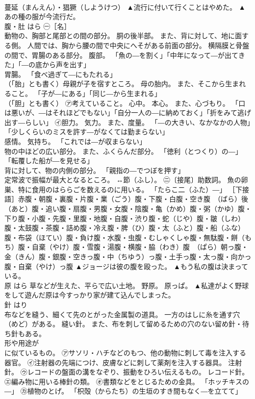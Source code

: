\documentclass[8pt]{extreport}
\begin{document}
\begin{CJK}{UTF8}{min}
\\	蔓延（まんえん）・猖獗（しようけつ）	▲流行に付いて行くことはやめた。 ▲あの種の服が今流行だ。
\\	腹・肚	はら	㊀［名］ 
\\	動物の、胸部と尾部との間の部分。 胴の後半部。 また、背に対して、地に面する側。 人間では、胸から腰の間で中央にへそがある前面の部分。 横隔膜と骨盤の間で、胃腸のある部分。 腹部。 「魚の―を割く」「中年になって―が出てきた」「―の底から声を出す」 
\\	胃腸。 「食べ過ぎて―にもたれる」 
\\	（「胎」とも書く）母親が子を宿すところ。 母の胎内。 また、そこから生まれること。 「子が―にある」「同じ―から生まれる」 
\\	（「胆」とも書く） ㋐考えていること。 心中。 本心。 また、心づもり。 「口は悪いが、―はそれほどでもない」「自分一人の―に納めておく」「折をみて逃げ出す―らしい」 ㋑胆力。 気力。 また、度量。 「―の大きい、なかなかの人物」「少しくらいのミスを許す―がなくては勤まらない」 
\\	感情。 気持ち。 「これでは―が収まらない」 
\\	物の中ほどの広い部分。 また、ふくらんだ部分。 「徳利（とつくり）の―」「転覆した船が―を見せる」 
\\	背に対して、物の内側の部分。 「親指の―でつぼを押す」 
\\	定常波で振幅が最大となるところ。 ↔節（ふし）。 ㊁〔接尾〕助数詞。 魚の卵巣、特に食用のはららごを数えるのに用いる。 「たらこ二（ふた）―」 ［下接語］赤腹・朝腹・裏腹・片腹・業（ごう）腹・下腹・白腹・空き腹　（ばら）後（あと）腹・追い腹・扇腹・男腹・女腹・陰腹・亀（かめ）腹・粥（かゆ）腹・下り腹・小腹・先腹・里腹・地腹・自腹・渋り腹・蛇（じや）腹・皺（しわ）腹・太鼓腹・茶腹・詰め腹・冷え腹・脾（ひ）腹・太（ふと）腹・船（ふな）腹・布袋（ほてい）腹・負け腹・水腹・虫腹・むしゃくしゃ腹・無駄腹・餅（もち）腹・自棄（やけ）腹・雪腹・湯腹・横腹・脇（わき）腹　（ぱら）朝っ腹・金（きん）腹・銀腹・空きっ腹・中（ちゆう）っ腹・土手っ腹・太っ腹・向かっ腹・自棄（やけ）っ腹	▲ジョージは彼の腹を殴った。 ▲もう私の腹は決まっている。
\\	原	はら	草などが生えた、平らで広い土地。 野原。 原っぱ。	▲私達がよく野球をして遊んだ原は今すっかり家が建て込んでしまった。
\\	針	はり	
\\	布などを縫う、細くて先のとがった金属製の道具。 一方のはしに糸を通す穴（めど）がある。 縫い針。 また、布を刺して留めるための穴のない留め針・待ち針もある。 
\\	形や用途が 
\\	に似ているもの。 ㋐サソリ・ハチなどのもつ、他の動物に刺して毒を注入する器官。 ㋑注射器の先端につけ、皮膚などに刺して薬剤を注入する器具。 注射針。 ㋒レコードの盤面の溝をなぞり、振動をひろい伝えるもの。 レコード針。 ㋓編み物に用いる棒針の類。 ㋔書類などをとじるための金具。 「ホッチキスの―」 ㋕植物のとげ。 「枳殻（からたち）の生垣のすき間もなく―を立てて」 

\end{CJK}
\end{document}
